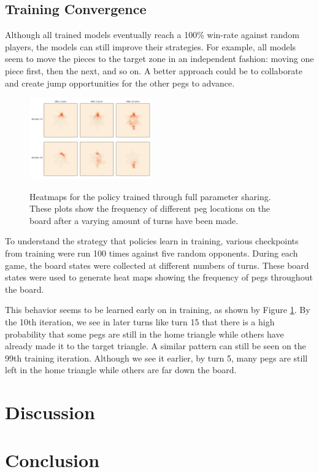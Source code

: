\documentclass[12pt, a4paper, twocolumn]{article}
\begin{document}
\subsection{Training Convergence}

Although all trained models eventually reach a 100\% win-rate against random players, the models can still improve their strategies. For example, all models seem to move the pieces to the target zone in an independent fashion: moving one piece first, then the next, and so on. A better approach could be to collaborate and create jump opportunities for the other pegs to advance.


\begin{figure}[ht]
  \centering
    \includegraphics[width=0.47\textwidth]{images/random_heatmap.png}
  \label{fig:heatmap}
  \caption{Heatmaps for the policy trained through full parameter sharing. These plots show the frequency of different peg locations on the board after a varying amount of turns have been made.}
\end{figure}

To understand the strategy that policies learn in training, various checkpoints from training were run 100 times against five random opponents. During each game, the board states were collected at different numbers of turns. These board states were used to generate heat maps showing the frequency of pegs throughout the board.

This behavior seems to be learned early on in training, as shown by Figure \ref{fig:heatmap}. By the 10th iteration, we see in later turns like turn 15 that there is a high probability that some pegs are still in the home triangle while others have already made it to the target triangle. A similar pattern can still be seen on the 99th training iteration. Although we see it earlier, by turn 5, many pegs are still left in the home triangle while others are far down the board.



\section{Discussion}

\lipsum[1]

\section{Conclusion}

\lipsum[1]


\nocite{*}


\end{document}
